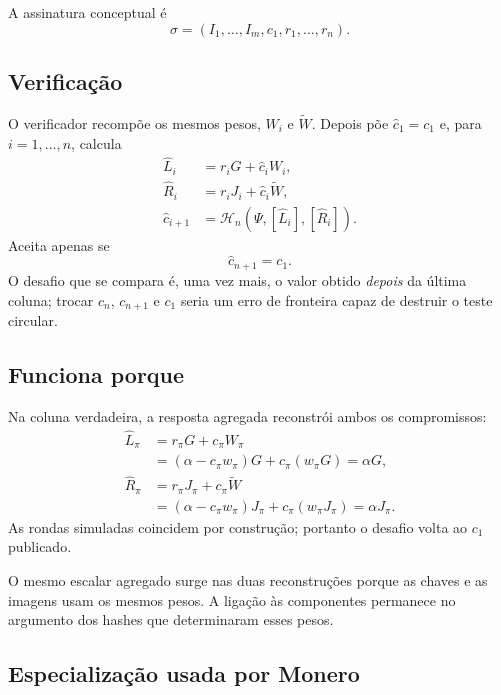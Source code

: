 A assinatura conceptual é
\[
\sigma=(I_1,\ldots,I_m,c_1,r_1,\ldots,r_n).
\]

\subsection*{Verificação}

O verificador recompõe os mesmos pesos, \(W_i\) e \(\widetilde W\). Depois
põe \(\widehat c_1=c_1\) e, para \(i=1,\ldots,n\), calcula
\begin{align*}
\widehat L_i&=r_iG+\widehat c_iW_i,\\
\widehat R_i&=r_iJ_i+\widehat c_i\widetilde W,\\
\widehat c_{i+1}
 &=\mathcal H_n(\Psi,[\widehat L_i],[\widehat R_i]).
\end{align*}
Aceita apenas se
\[
\widehat c_{n+1}=c_1.
\]
O desafio que se compara é, uma vez mais, o valor obtido \emph{depois} da
última coluna; trocar \(c_n\), \(c_{n+1}\) e \(c_1\) seria um erro de fronteira
capaz de destruir o teste circular.

\subsection*{Funciona porque}

Na coluna verdadeira, a resposta agregada reconstrói ambos os compromissos:
\begin{align*}
\widehat L_\pi
 &=r_\pi G+c_\pi W_\pi\\
 &=(\alpha-c_\pi w_\pi)G+c_\pi(w_\pi G)
  =\alpha G,\\
\widehat R_\pi
 &=r_\pi J_\pi+c_\pi\widetilde W\\
 &=(\alpha-c_\pi w_\pi)J_\pi+c_\pi(w_\pi J_\pi)
  =\alpha J_\pi.
\end{align*}
As rondas simuladas coincidem por construção; portanto o desafio volta ao
\(c_1\) publicado.

O mesmo escalar agregado surge nas duas reconstruções porque as chaves
e as imagens usam os mesmos pesos. A ligação às componentes permanece
no argumento dos hashes que determinaram esses pesos.

\subsection*{Especialização usada por Monero}


